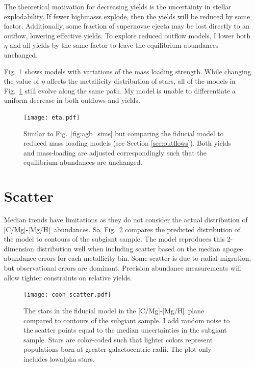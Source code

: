 \documentclass[12pt,oneside,letterpaper]{report}
\newcommand{\apogee}{\gls{apogee}}
\newcommand{\caah}{[C/Mg]-[Mg/H]}
\begin{document}
The theoretical motivation for decreasing yields is the uncertainty in stellar explodability.
If fewer \glspl{highmass} explode, then the yields will be reduced by some factor. Additionally, some fraction of supernovae ejecta may be lost directly to an outflow, lowering effective yields. To explore reduced outflow models, I lower both $\eta$ and all yields by the same factor to leave the equilibrium abundances unchanged. 

Fig.~\ref{fig:eta} shows models with variations of the mass loading strength. While changing the value of $\eta$ affects the metallicity distribution of stars, all of the models in Fig.~\ref{fig:eta} still evolve along the same path. My model is unable to differentiate a uniform decrease in both outflows and yields.

\begin{figure}[htp]
    \centering
    \texttt{[image: eta.pdf]}
    \caption[Reduced-Outflow Models]{Similar to Fig.~\ref{fig:agb_sims} but comparing the fiducial model to reduced mass loading models (see Section  \ref{sec:outflows}). Both yields and mass-loading are adjusted correspondingly such that the equilibrium abundances are unchanged. }
    \label{fig:eta}
\end{figure}


\section{Scatter}

Median trends have limitations as they do not consider the actual distribution of \caah~abundances. So, Fig.~\ref{fig:scatter} compares the predicted distribution of the model to contours of the \gls{subgiant} sample. The model reproduces this 2-dimension distribution well when including scatter based on the median \apogee{} abundance errors for each metallicity bin. Some scatter is due to radial migration, but observational errors are dominant. Precision abundance measurements will allow tighter constraints on relative yields. 

\begin{figure}[htp]
    \centering
    \texttt{[image: cooh\_scatter.pdf]}
    \caption[Scatter Agreement]{The stars in the fiducial model in the \caah~plane compared to contours of the \gls{subgiant} sample. I add random noise to the scatter points equal to the median uncertainties in the \gls{subgiant} sample. Stars are color-coded such that lighter colors represent populations born at greater galactocentric radii. The plot only includes \gls{lowalpha} stars.
    }
    \label{fig:scatter}
\end{figure}
\end{document}
